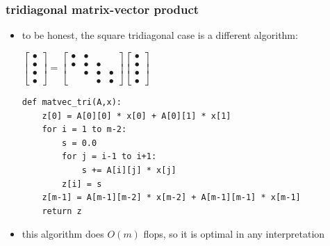 \documentclass[10pt,
               svgnames,
               hyperref={colorlinks,citecolor=DeepPink4,linkcolor=FireBrick,urlcolor=Maroon},
               usepdftitle=false]{beamer}
\begin{document}
\newcommand{\bulletaxtri}{\begin{bmatrix} \bullet \\ \bullet \\ \bullet \\ \bullet \end{bmatrix} = \begin{bmatrix} \bullet & \bullet & & \\ \bullet & \bullet & \bullet & \\ & \bullet & \bullet & \bullet \\ & & \bullet & \bullet \end{bmatrix} \begin{bmatrix} \bullet \\ \bullet \\ \bullet \\ \bullet \end{bmatrix}}

\begin{frame}[fragile]
\frametitle{tridiagonal matrix-vector product}

\begin{itemize}
\item to be honest, the square tridiagonal case is a different algorithm:

\bigskip

\hfill
{\scriptsize $\displaystyle \bulletaxtri$}

\begin{center}
\begin{minipage}{0.8\textwidth}
\begin{verbatim}
def matvec_tri(A,x):
    z[0] = A[0][0] * x[0] + A[0][1] * x[1]
    for i = 1 to m-2:
        s = 0.0
        for j = i-1 to i+1:
            s += A[i][j] * x[j]
        z[i] = s
    z[m-1] = A[m-1][m-2] * x[m-2] + A[m-1][m-1] * x[m-1]
    return z
\end{verbatim}
\end{minipage}
\end{center}

\bigskip
\item this algorithm does $O(m)$ flops, so it is optimal in any interpretation
\end{itemize}
\end{frame}
\end{document}
